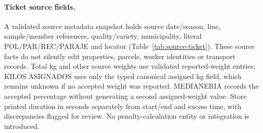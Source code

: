 \paragraph{Ticket source fields.}
A validated source metadata snapshot holds source date/season, line, sample/member
references, quality/variety, municipality, literal POL/PAR/REC/PARAJE and locator
(Table~\ref{tab:source-ticket}). These source facts do not silently edit properties,
parcels, worker identities or transport records. Total kg and other source weights use validated reported-weight entries; KILOS ASIGNADOS uses only the typed canonical assigned kg field, which remains unknown if no accepted weight was reported. MEDIANERIA records the accepted percentage without generating a second assigned-weight value. Store printed
duration in seconds separately from start/end and excess time, with discrepancies
flagged for review. No penalty-calculation entity or integration is introduced.
